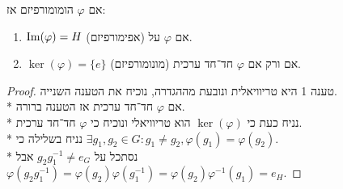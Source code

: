 \begin{proposition}
	אם $\varphi$ הומומורפיזם אז:
	\begin{enumerate}
		\item $\operatorname{Im}(\varphi) = H$ אם $\varphi$ על (אפימורפיזם).
		\item $\ker(\varphi) = \{e\}$ אם ורק אם $\varphi$ חד־חד ערכית (מונומורפיזם).
	\end{enumerate}
\end{proposition}
\begin{proof}
	טענה 1 היא טריוויאלית ונובעת מההגדרה, נוכיח את הטענה השנייה. \\*
	אם $\varphi$ חד־חד ערכית אז הטענה ברורה. \\*
	נניח כעת כי $\ker(\varphi)$ הוא טריוויאלי ונוכיח כי $\varphi$ חד־חד ערכית. \\*
	נניח בשלילה כי $\exists g_1, g_2 \in G : g_1 \ne g_2, \varphi(g_1) = \varphi(g_2)$. \\*
	נסתכל על $g_2 g_1^{-1} \ne e_G$
	אבל $\varphi(g_2g_1^{-1}) = \varphi(g_2) \varphi(g_1^{-1}) = \varphi(g_2)\varphi^{-1}(g_1) = e_H$.
\end{proof}


